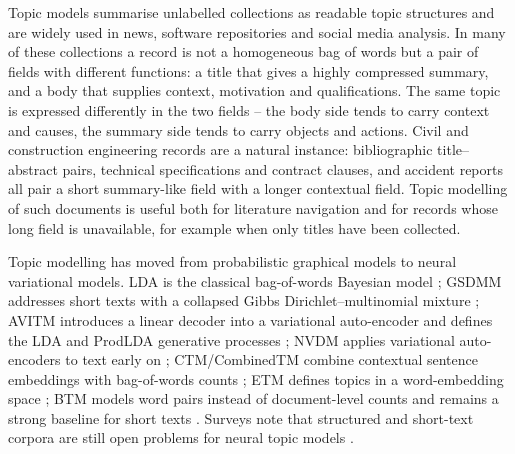 \documentclass[Journal,letterpaper]{ascelike-new}
\begin{document}
Topic models summarise unlabelled collections as readable topic structures and are widely used in
news, software repositories and social media analysis. In many of these collections a record is not
a homogeneous bag of words but a pair of fields with different functions: a title that gives a
highly compressed summary, and a body that supplies context, motivation and qualifications. The
same topic is expressed differently in the two fields -- the body side tends to carry context and
causes, the summary side tends to carry objects and actions. Civil and construction engineering
records are a natural instance: bibliographic title--abstract pairs, technical specifications and
contract clauses, and accident reports all pair a short summary-like field with a longer contextual
field. Topic modelling of such documents is useful both for literature navigation and for records
whose long field is unavailable, for example when only titles have been collected.

Topic modelling has moved from probabilistic graphical models to neural variational models. LDA is
the classical bag-of-words Bayesian model \cite{blei2003lda}; GSDMM addresses short texts with a
collapsed Gibbs Dirichlet--multinomial mixture \cite{yin2014gsdmm}; AVITM introduces a linear
decoder into a variational auto-encoder and defines the LDA and ProdLDA generative processes
\cite{srivastava2017avitm}; NVDM applies variational auto-encoders to text early on
\cite{miao2016nvdm}; CTM/CombinedTM combine contextual sentence embeddings with bag-of-words
counts \cite{bianchi2021ctm}; ETM defines topics in a word-embedding space \cite{dieng2020etm};
BTM models word pairs instead of document-level counts and remains a strong baseline for short
texts \cite{yan2013btm}. Surveys note that structured and short-text corpora are still open
problems for neural topic models \cite{wu2024survey}.
\end{document}

